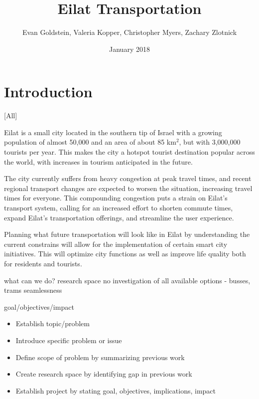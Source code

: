 \documentclass[12pt]{article}                         %
\title{Eilat Transportation}
\author{Evan Goldstein, Valeria Kopper, Christopher Myers, Zachary Zlotnick}
\date{January 2018}
\begin{document}
\maketitle
\newpage

\renewcommand\abstractname{Summary} %

\tableofcontents
\newpage
\listofauthorships
\newpage
{}
\doublespacing

\section{Introduction}[All]

Eilat is a small city located in the southern tip of Israel with a growing population of almost 50,000 and an area of about 85 km$^2$, but with 3,000,000 tourists per year. This makes the city a hotspot tourist destination popular across the world, with increases in tourism anticipated in the future.

The city currently suffers from heavy congestion at peak travel times, and recent regional transport changes are expected to worsen the situation, increasing travel times for everyone. This compounding congestion puts a strain on Eilat's transport system, calling for an increased effort to shorten commute times, expand Eilat's transportation offerings, and streamline the user experience.

Planning what future transportation will look like in Eilat by understanding the current constrains will allow for the implementation of certain smart city initiatives. This will optimize city functions as well as improve life quality both for residents and tourists. 

what can we do? research space 
	no investigation of all available options - busses, trams
    seamlessness
    

goal/objectives/impact


\begin{itemize}
    \item Establish topic/problem
    \item Introduce specific problem or issue
    \item Define scope of problem by summarizing previous work
    \item Create research space by identifying gap in previous work
    \item Establish project by stating goal, objectives, implications, impact
\end{itemize}
\end{document}
